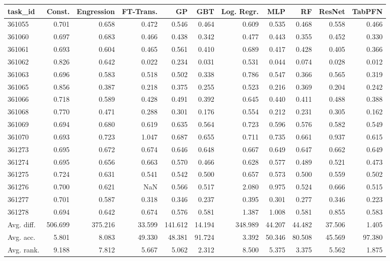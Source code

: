 \begin{tabular}{lrrrrrrrrrr}
\toprule
task\_id & Const. & Engression & FT-Trans. & GP & GBT & Log. Regr. & MLP & RF & ResNet & TabPFN \\
\midrule
361055 & 0.701 & 0.658 & 0.472 & 0.546 & 0.464 & 0.609 & 0.535 & 0.468 & 0.558 & 0.466 \\
361060 & 0.697 & 0.683 & 0.466 & 0.438 & 0.342 & 0.477 & 0.443 & 0.355 & 0.452 & 0.330 \\
361061 & 0.693 & 0.604 & 0.465 & 0.561 & 0.410 & 0.689 & 0.417 & 0.428 & 0.405 & 0.366 \\
361062 & 0.826 & 0.642 & 0.022 & 0.234 & 0.031 & 0.531 & 0.044 & 0.074 & 0.028 & 0.012 \\
361063 & 0.696 & 0.583 & 0.518 & 0.502 & 0.338 & 0.786 & 0.547 & 0.366 & 0.565 & 0.319 \\
361065 & 0.856 & 0.387 & 0.218 & 0.375 & 0.255 & 0.523 & 0.216 & 0.369 & 0.204 & 0.242 \\
361066 & 0.718 & 0.589 & 0.428 & 0.491 & 0.392 & 0.645 & 0.440 & 0.411 & 0.488 & 0.388 \\
361068 & 0.770 & 0.471 & 0.288 & 0.301 & 0.176 & 0.554 & 0.212 & 0.231 & 0.305 & 0.162 \\
361069 & 0.694 & 0.680 & 0.619 & 0.635 & 0.564 & 0.723 & 0.596 & 0.576 & 0.582 & 0.549 \\
361070 & 0.693 & 0.723 & 1.047 & 0.687 & 0.655 & 0.711 & 0.735 & 0.661 & 0.937 & 0.615 \\
361273 & 0.695 & 0.672 & 0.674 & 0.646 & 0.648 & 0.667 & 0.649 & 0.647 & 0.662 & 0.649 \\
361274 & 0.695 & 0.656 & 0.663 & 0.570 & 0.466 & 0.628 & 0.577 & 0.489 & 0.521 & 0.473 \\
361275 & 0.724 & 0.631 & 0.541 & 0.542 & 0.500 & 0.657 & 0.573 & 0.500 & 0.559 & 0.502 \\
361276 & 0.700 & 0.621 & NaN & 0.566 & 0.517 & 2.080 & 0.975 & 0.524 & 0.666 & 0.515 \\
361277 & 0.701 & 0.587 & 0.318 & 0.346 & 0.237 & 0.395 & 0.301 & 0.277 & 0.346 & 0.223 \\
361278 & 0.694 & 0.642 & 0.674 & 0.576 & 0.581 & 1.387 & 1.008 & 0.581 & 0.855 & 0.583 \\
Avg. diff. & 506.699 & 375.216 & 33.599 & 141.612 & 14.194 & 348.989 & 44.207 & 44.482 & 37.506 & 1.405 \\
Avg. acc. & 5.801 & 8.083 & 49.330 & 48.381 & 91.724 & 3.392 & 50.346 & 80.508 & 45.569 & 97.380 \\
Avg. rank. & 9.188 & 7.812 & 5.667 & 5.062 & 2.312 & 8.500 & 5.375 & 3.375 & 5.562 & 1.875 \\
\bottomrule
\end{tabular}
